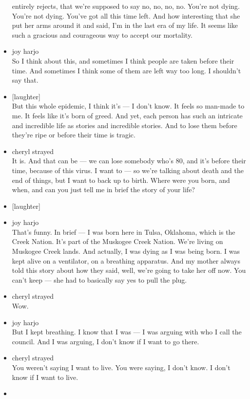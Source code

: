 \begin{itemize}
  entirely rejects, that we're supposed to say no, no, no, no. You're
  not dying. You're not dying. You've got all this time left. And how
  interesting that she put her arms around it and said, I'm in the last
  era of my life. It seems like such a gracious and courageous way to
  accept our mortality.
\item
  joy harjo\\
  So I think about this, and sometimes I think people are taken before
  their time. And sometimes I think some of them are left way too long.
  I shouldn't say that.
\item
  {[}laughter{]}\\
  But this whole epidemic, I think it's --- I don't know. It feels so
  man-made to me. It feels like it's born of greed. And yet, each person
  has such an intricate and incredible life as stories and incredible
  stories. And to lose them before they're ripe or before their time is
  tragic.
\item
  cheryl strayed\\
  It is. And that can be --- we can lose somebody who's 80, and it's
  before their time, because of this virus. I want to --- so we're
  talking about death and the end of things, but I want to back up to
  birth. Where were you born, and when, and can you just tell me in
  brief the story of your life?
\item
  {[}laughter{]}
\item
  joy harjo\\
  That's funny. In brief --- I was born here in Tulsa, Oklahoma, which
  is the Creek Nation. It's part of the Muskogee Creek Nation. We're
  living on Muskogee Creek lands. And actually, I was dying as I was
  being born. I was kept alive on a ventilator, on a breathing
  apparatus. And my mother always told this story about how they said,
  well, we're going to take her off now. You can't keep --- she had to
  basically say yes to pull the plug.
\item
  cheryl strayed\\
  Wow.
\item
  joy harjo\\
  But I kept breathing. I know that I was --- I was arguing with who I
  call the council. And I was arguing, I don't know if I want to go
  there.
\item
  cheryl strayed\\
  You weren't saying I want to live. You were saying, I don't know. I
  don't know if I want to live.
\item

\end{itemize}

